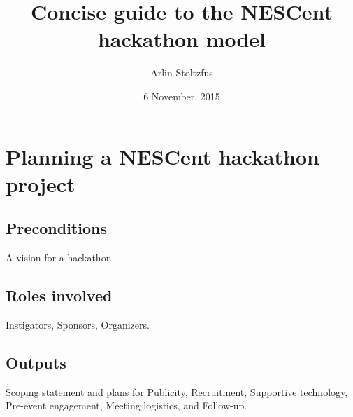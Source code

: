 \documentclass[letterpaper,11pt]{texMemo}
\date{6 November, 2015}
\title{Concise guide to the NESCent hackathon model}
\author{Arlin Stoltzfus}
\begin{document}
\renewcommand*\contentsname{Concise guide to planning and staging a NESCent hackathon}
\tableofcontents

\newpage
\section{Planning a NESCent hackathon project}
\subsection{Preconditions}
A vision for a hackathon.

\subsection{Roles involved}
Instigators, Sponsors, Organizers.

\subsection{Outputs}
Scoping statement and plans for Publicity, Recruitment, Supportive technology, Pre-event engagement, Meeting logistics, and Follow-up.
\end{document}
